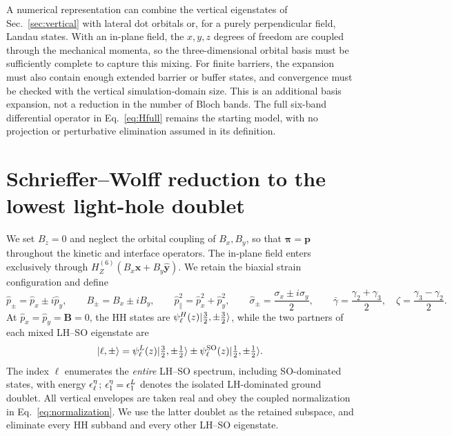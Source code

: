 A numerical representation can combine the vertical eigenstates of Sec.~\ref{sec:vertical} with lateral dot orbitals or, for a purely perpendicular field, Landau states. With an in-plane field, the $x,y,z$ degrees of freedom are coupled through the mechanical momenta, so the three-dimensional orbital basis must be sufficiently complete to capture this mixing. For finite barriers, the expansion must also contain enough extended barrier or buffer states, and convergence must be checked with the vertical simulation-domain size. This is an additional basis expansion, not a reduction in the number of Bloch bands. The full six-band differential operator in Eq.~\eqref{eq:Hfull} remains the starting model, with no projection or perturbative elimination assumed in its definition.














\section{Schrieffer--Wolff reduction to the lowest light-hole doublet}
\label{sec:swt6-inplane}

We set $B_z=0$ and neglect the orbital coupling of $B_x,B_y$,
so that $\bm\pi=\bm p$ throughout the kinetic and interface operators.
The in-plane field enters exclusively through
$H_Z^{(6)}(B_x\hat{\bm x}+B_y\hat{\bm y})$.
We retain the biaxial strain configuration and define
\begin{equation}
  \hat{p}_ \pm= \hat{p}_ x\pm i \hat{p}_ y,\qquad
 B_\pm=B_x\pm iB_y,\qquad
 \hat p_\parallel^2= \hat{p}_ x^2+ \hat{p}_ y^2,\qquad
 \hat\sigma_\pm=\frac{\sigma_x\pm i\sigma_y}{2},\qquad
 \bar\gamma=\frac{\gamma_2+\gamma_3}{2},\quad
 \zeta=\frac{\gamma_3-\gamma_2}{2}.
 \label{eq:swt6-notation}
\end{equation}
At $ \hat{p}_ x= \hat{p}_ y=\bm B=0$, the HH states are
$\psi_\ell^H(z)\lvert \tfrac32,\pm\tfrac32\rangle$, while the two
partners of each mixed LH--SO eigenstate are
\begin{equation}
 \lvert \ell,\pm\rangle=\psi_\ell^L(z)\lvert \tfrac32,\pm\tfrac12\rangle
 \pm\psi_\ell^{\mathrm{SO}}(z)\lvert \tfrac12,\pm\tfrac12\rangle.
 \label{eq:swt6-partners}
\end{equation}
The index $\ell$ enumerates the \emph{entire} LH--SO spectrum,
including SO-dominated states, with energy $\epsilon_ \ell^\eta$;
$\epsilon_ 1^\eta=\epsilon_ 1^L$ denotes the isolated LH-dominated ground doublet.
All vertical envelopes are taken real and obey the coupled normalization
in Eq.~\eqref{eq:normalization}. We use the latter doublet as the
retained subspace, and eliminate every HH subband and every other
LH--SO eigenstate.

